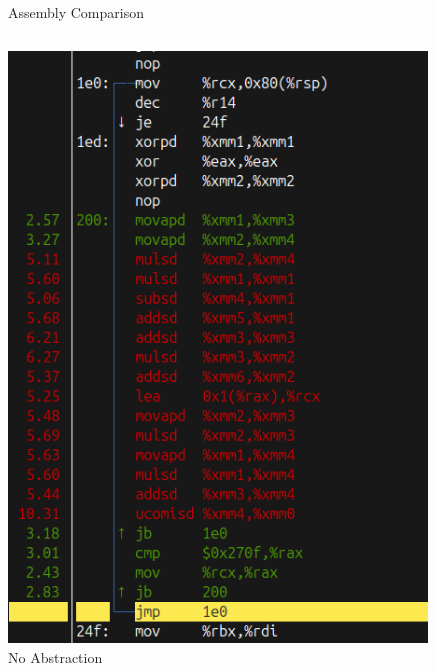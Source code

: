 \documentclass{beamer}
\begin{document}
\begin{frame}{Assembly Comparison}
    \begin{columns}
        \begin{column}{0.45\textwidth}
            \centering
            \includegraphics[width=0.9\textwidth,height=0.8\textheight,keepaspectratio]{images/V4_assembly_normal.png}
            \\
            \footnotesize No Abstraction
        \end{column}
        \hfill
        \begin{column}{0.45\textwidth}
            \centering

\end{column}
\end{columns}
\end{frame}
\end{document}
